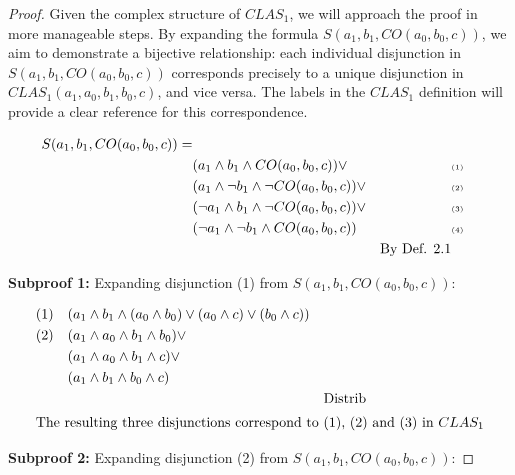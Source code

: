 \documentclass{article}
\begin{document}
\begin{proof}
	
	Given the complex structure of $CLAS_1$, we will approach the proof in more manageable steps. By expanding the formula $ S(a_1, b_1, CO(a_0, b_0, c)) $, we aim to demonstrate a bijective relationship: each individual disjunction in  $ S(a_1, b_1, CO(a_0, b_0, c)) $ corresponds precisely to a unique disjunction in $ CLAS_1(a_1, a_0, b_1, b_0, c) $, and vice versa. The labels in the $ CLAS_1 $ definition will provide a clear reference for this correspondence.
	
	\begin{align*}
		S(a_1, b_1, CO(a_0, b_0, c)) = \\ 
		& (a_1 \land b_1 \land CO(a_0, b_0, c)) \lor && \text{\tiny (1)} \\ 
		& (a_1 \land \lnot b_1 \land \lnot CO(a_0, b_0, c)) \lor && \text{\tiny (2)} \\ 
		& (\lnot a_1 \land b_1 \land \lnot CO(a_0, b_0, c)) \lor && \text{\tiny (3)} \\
		& (\lnot a_1 \land \lnot b_1 \land CO(a_0, b_0, c))  && \text{\tiny (4)} \\ 
		&& \text{By Def. 2.1}
	\end{align*}
	
\textbf{Subproof 1:}  Expanding disjunction (1)  from $S(a_1, b_1, CO(a_0, b_0, c))$:

\begin{align*}
	(1)  & \quad (a_1 \land b_1 \land (a_0 \land b_0) \lor (a_0 \land c) \lor (b_0 \land c) ) \\
	(2)  & \quad  (a_1 \land a_0 \land b_1   \land b_0) \lor \\
  & \quad (a_1 \land a_0 \land b_1   \land c) \lor \\
  & \quad (a_1 \land b_1  \land b_0 \land c)  \\
  && \text{Distrib} \\	
  \intertext{The resulting three  disjunctions correspond to (1), (2) and (3) in $CLAS_1$}
\end{align*}
	
	\textbf{Subproof 2:}  Expanding disjunction (2)  from $S(a_1, b_1, CO(a_0, b_0, c))$:


\end{proof}
\end{document}
